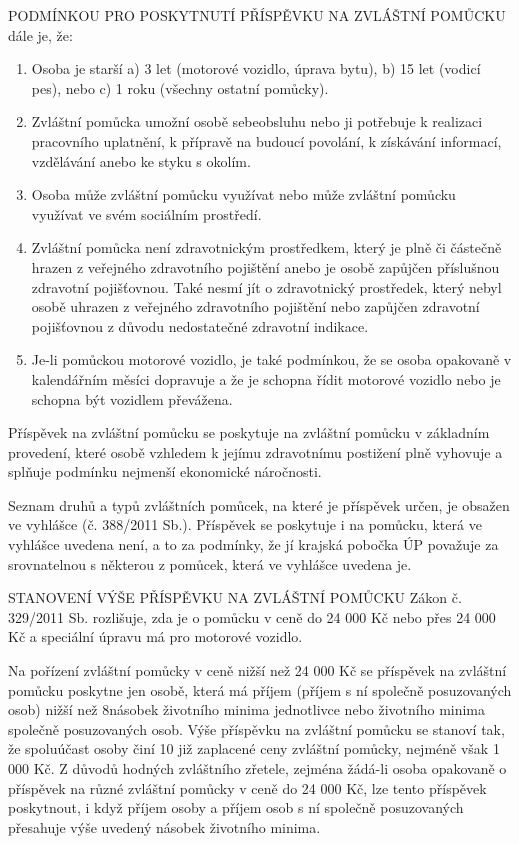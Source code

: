 \documentclass[thesis=M,czech]{FITthesis}[2012/06/26]
\begin{document}
PODMÍNKOU PRO POSKYTNUTÍ PŘÍSPĚVKU NA ZVLÁŠTNÍ POMŮCKU dále je, že:
\begin{enumerate}
    \item Osoba je starší
        a) 3 let (motorové vozidlo, úprava bytu),
        b) 15 let (vodicí pes), nebo
        c) 1 roku (všechny ostatní pomůcky).
   
    \item Zvláštní pomůcka umožní osobě sebeobsluhu nebo ji potřebuje k
realizaci pracovního uplatnění, k přípravě na budoucí povolání, k získávání
informací, vzdělávání anebo ke styku s okolím.
    \item Osoba může zvláštní pomůcku využívat nebo může zvláštní pomůcku
využívat ve svém sociálním prostředí.
    \item Zvláštní pomůcka není zdravotnickým prostředkem, který je plně či
částečně hrazen z veřejného zdravotního pojištění anebo je osobě zapůjčen
příslušnou zdravotní pojišťovnou. Také nesmí jít o         zdravotnický
prostředek, který nebyl osobě uhrazen z veřejného zdravotního pojištění nebo
zapůjčen zdravotní pojišťovnou z důvodu nedostatečné zdravotní indikace.
    \item Je-li pomůckou motorové vozidlo, je také podmínkou, že se osoba
opakovaně v kalendářním měsíci dopravuje a že je schopna řídit motorové
vozidlo nebo je schopna být vozidlem převážena.
\end{enumerate}

Příspěvek na zvláštní pomůcku se poskytuje na zvláštní pomůcku v základním
provedení, které osobě vzhledem k jejímu zdravotnímu postižení plně vyhovuje
a splňuje podmínku nejmenší ekonomické náročnosti.

Seznam druhů a typů zvláštních pomůcek, na které je příspěvek určen, je
obsažen ve vyhlášce (č. 388/2011 Sb.). Příspěvek se poskytuje i na pomůcku,
která ve vyhlášce uvedena není, a to za podmínky, že jí krajská pobočka ÚP
považuje za srovnatelnou s některou z pomůcek, která ve vyhlášce uvedena je.

STANOVENÍ VÝŠE PŘÍSPĚVKU NA ZVLÁŠTNÍ POMŮCKU
Zákon č. 329/2011 Sb. rozlišuje, zda je o pomůcku v ceně do 24 000 Kč  nebo
přes 24 000 Kč a speciální úpravu má pro motorové vozidlo.

Na pořízení zvláštní pomůcky v ceně nižší než 24 000 Kč se příspěvek na
zvláštní pomůcku poskytne jen osobě, která má příjem (příjem s ní společně
posuzovaných osob) nižší než 8násobek životního minima jednotlivce nebo
životního minima společně posuzovaných osob. Výše příspěvku na zvláštní
pomůcku se stanoví tak, že spoluúčast osoby činí 10 %
již zaplacené ceny zvláštní pomůcky, nejméně však 1 000 Kč. Z důvodů hodných
zvláštního zřetele, zejména žádá-li osoba opakovaně o příspěvek na různé
zvláštní pomůcky v ceně do 24 000 Kč, lze tento příspěvek poskytnout, i když
příjem osoby a příjem osob s ní společně posuzovaných přesahuje výše uvedený
násobek životního minima.
\end{document}
